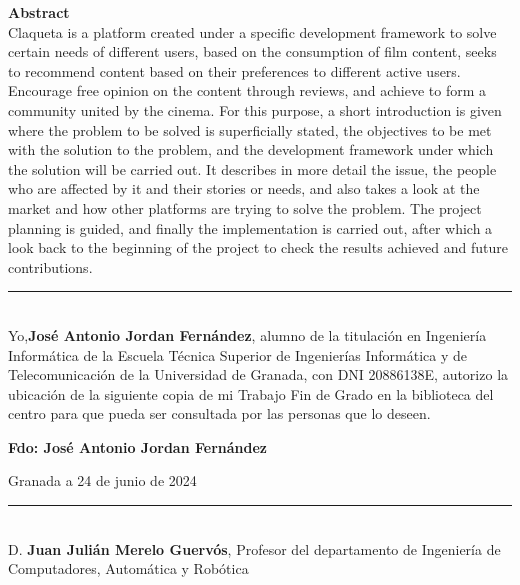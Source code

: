 \noindent\textbf{Abstract}\\

Claqueta is a platform created under a specific development framework to solve certain needs of different users, based on the consumption of film content, seeks to recommend content based on their preferences to different active users. Encourage free opinion on the content through reviews, and achieve to form a community united by the cinema. For this purpose, a short introduction is given where the problem to be solved is superficially stated, the objectives to be met with the solution to the problem, and the development framework under which the solution will be carried out. It describes in more detail the issue, the people who are affected by it and their stories or needs, and also takes a look at the market and how other platforms are trying to solve the problem. The project planning is guided, and finally the implementation is carried out, after which a look back to the beginning of the project to check the results achieved and future contributions.

\cleardoublepage


\thispagestyle{empty}

\noindent\rule[-1ex]{\textwidth}{2pt}\\[4.5ex]

Yo,\textbf{José Antonio Jordan Fernández}, alumno de la titulación en Ingeniería Informática de la Escuela Técnica 
Superior de Ingenierías Informática y de Telecomunicación de la Universidad de Granada, con DNI
20886138E, autorizo la ubicación de la siguiente copia de mi Trabajo
Fin de Grado en la biblioteca del centro para que pueda ser consultada por
las personas que lo deseen. 



\vspace{5cm}

\noindent \textbf{Fdo: José Antonio Jordan Fernández }

\vspace{1cm}

 \begin{center}
     \noindent Granada a 24 de junio de 2024
 \end{center}

\cleardoublepage

\thispagestyle{empty}

\noindent\rule[-1ex]{\textwidth}{2pt}\\[4.5ex]

D. \textbf{Juan Julián Merelo Guervós}, Profesor del departamento de Ingeniería de Computadores, Automática y Robótica 

